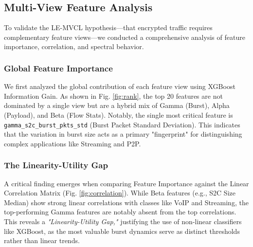 \begin{table}[htbp]
\caption{Stage 1: Binary Gatekeeper Performance (VNAT Dataset)}
\label{tab:binary_vnat}
\centering
\scriptsize
\setlength{\tabcolsep}{3pt}
\end{table}

\subsection{Multi-View Feature Analysis}
\label{subsec:feature_analysis}

To validate the LE-MVCL hypothesis—that encrypted traffic requires complementary feature views—we conducted a comprehensive analysis of feature importance, correlation, and spectral behavior.

\subsubsection{Global Feature Importance}
We first analyzed the global contribution of each feature view using XGBoost Information Gain. As shown in Fig. \ref{fig:rank}, the top 20 features are not dominated by a single view but are a hybrid mix of Gamma (Burst), Alpha (Payload), and Beta (Flow Stats). Notably, the single most critical feature is \texttt{gamma\_s2c\_burst\_pkts\_std} (Burst Packet Standard Deviation). This indicates that the variation in burst size acts as a primary "fingerprint" for distinguishing complex applications like Streaming and P2P.

\subsubsection{The Linearity-Utility Gap}
A critical finding emerges when comparing Feature Importance against the Linear Correlation Matrix (Fig. \ref{fig:correlation}). While Beta features (e.g., S2C Size Median) show strong linear correlations with classes like VoIP and Streaming, the top-performing Gamma features are notably absent from the top correlations. This reveals a \textit{"Linearity-Utility Gap,"} justifying the use of non-linear classifiers like XGBoost, as the most valuable burst dynamics serve as distinct thresholds rather than linear trends.

